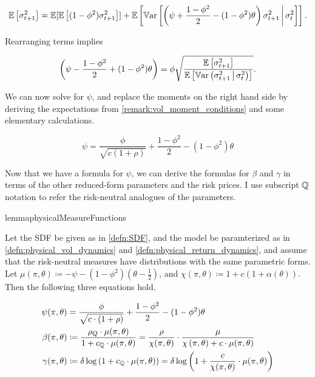 \documentclass[11pt, letterpaper, twoside, final]{article}
\begin{document}
\begin{equation}
    \operatorname{\mathbb{E}}\left[\sigma^2_{t+1} \right]  = \operatorname{\mathbb{E}}[ \operatorname{\mathbb{E}}\left[(1 - \phi^2) \sigma^2_{t+1} \right]] +
    \operatorname{\mathbb{E}}\left[\operatorname{\mathbb{V}ar}\left[\left(\psi + \frac{1-\phi^2}{2} - (1-\phi^2)\theta\right) \sigma^2_{t+1} \,\middle\vert\,
    \sigma^2_t\right]\right].
\end{equation}

Rearranging terms implies 

\begin{equation}
    \label{eqn:psi_tilde_eqn}
    \left(\psi - \frac{1-\phi^2}{2} + (1-\phi^2)\theta\right) = \phi \sqrt{\frac{\operatorname{\mathbb{E}}\left[\sigma^2_{t+1}
    \right]}{\operatorname{\mathbb{E}} \left[\operatorname{\mathbb{V}ar}\left(\sigma^2_{t+1} \,\middle\vert\, \sigma^2_t\right)\right]}}.
\end{equation}

We can now solve for $\psi$, and replace the moments on the right hand side by deriving the expectations from
\cref{remark:vol_moment_conditions} and some elementary calculations. 

\begin{equation}
    \label{eqn:psi_pp_as_func_of_params}
    \psi = \frac{\phi}{\sqrt{c (1 + \rho)}} + \frac{1 - \phi^2}{2}  - (1 - \phi^2) \theta
\end{equation}

Now that we have a formula for $\psi$, we can derive the formulas for $\beta$ and $\gamma$ in terms of the
other reduced-form parameters and the risk prices. 
I use subscript $\mathbb{Q}$ notation to refer the risk-neutral analogues of the parameters.

\begin{restatable}{lemma}{physicalMeasureFunctions}

    
    \label{lemma:reparamterizing_physical_dist}
    Let the SDF be given as in \cref{defn:SDF}, and the model be paramterized as in
    \cref{defn:physical_vol_dynamics} and \cref{defn:physical_return_dynamics}, and assume that the risk-neutral
    measures have distributions with the same parametric forms.
    Let $\mu(\pi, \theta) \coloneqq -\psi - (1-\phi^2)\left(\theta - \frac{1}{2}\right)$, and $\chi(\pi, \theta)
    \coloneqq 1 + c (1+ \alpha(\theta))$. 
    Then the following three equations hold.


    \begin{align}
        \label{eqn:psi_function}
        \psi(\pi, \theta) &= \frac{\phi}{\sqrt{c \cdot (1 + \rho)}} + \frac{1 - \phi^2}{2} - (1 - \phi^2)
        \theta  \\
%
        \label{eqn:beta_function}
        \beta(\pi, \theta) &\coloneqq \frac{\rho_{Q} \cdot \mu(\pi, \theta)}{1 + c_{\QQ} \cdot \mu(\pi, \theta)} =
        \frac{\rho}{\chi(\pi, \theta)} \cdot \frac{\mu}{\chi\left(\pi, \theta\right) + c \cdot \mu(\pi,
        \theta)}  \\
        \label{eqn:gamma_function}
        \gamma(\pi, \theta) &\coloneqq \delta \log\left(1 + c_{\QQ} \cdot \mu(\pi, \theta)\right) = \delta
        \log\left(1 + \frac{c}{\chi(\pi,\theta)} \cdot \mu(\pi,\theta) \right) 
    \end{align}

\end{restatable}
\end{document}
